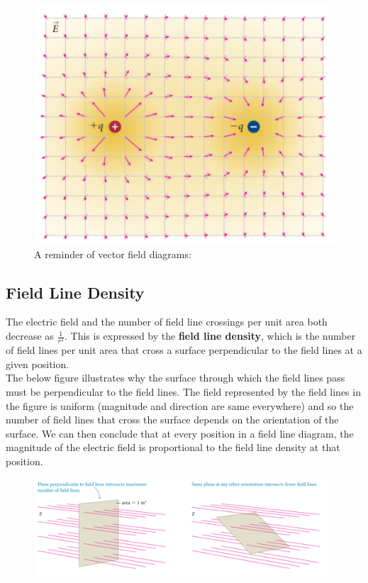         \begin{figure}[hbt!]
            \centering
            \caption*{A reminder of vector field diagrams:}
            \includegraphics[scale = 0.75]{Resources/24.1_Vector_Diagram}
        \end{figure}

    \subsection{Field Line Density}     %

        The electric field and the number of field line crossings per unit area both decrease as $\frac{1}{r^2}$. This is expressed by the \textbf{field line density}, which is the number of field lines per unit area
        that cross a surface perpendicular to the field lines at a given position. \\

        The below figure illustrates why the surface through which the field lines pass must be perpendicular to the field lines. The field represented by the field lines in the figure is uniform (magnitude and direction
        are same everywhere) and so the number of field lines that cross the surface depends on the orientation of the surface. We can then conclude that at every position in a field line diagram, the magnitude of the
        electric field is proportional to the field line density at that position.

        \begin{figure}[hbt!]
            \centering
            \includegraphics[scale = 0.75]{Resources/24.2_Field_Lines_Crossing_Surface}
        \end{figure}


